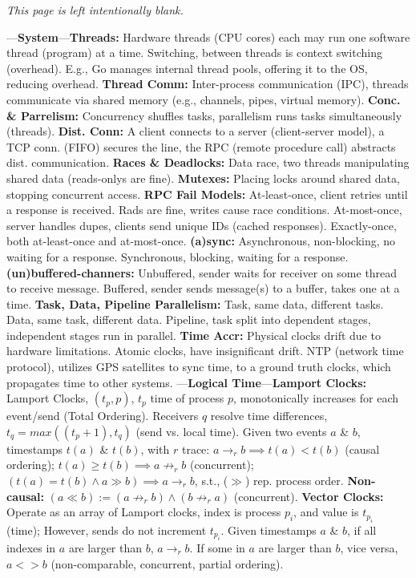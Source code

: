 


\thispagestyle{empty}
\mbox{}
\vfill
\begin{center}
    \textit{This page is left intentionally blank.}
\end{center}
\vfill
\newpage
\noindent


\begin{multicols}{2}

\noindent
---\textbf{System}---\textbf{Threads:} Hardware threads (CPU cores) each
may run one software thread (program) at a time. Switching,
between threads is context switching (overhead). E.g.,
Go manages internal thread pools, offering it to the OS,
reducing overhead.
\textbf{Thread Comm:} Inter-process communication (IPC), 
threads communicate via shared memory (e.g., channels, pipes, virtual memory).
\textbf{Conc. \& Parrelism:} Concurrency shuffles tasks,
parallelism runs tasks simultaneously (threads).
\textbf{Dist. Conn:} A client connects to a server (client-server model), a TCP conn. (FIFO)
secures the line, the RPC (remote procedure call) abstracts
dist. communication.
\textbf{Races \& Deadlocks:} Data race, two threads manipulating shared data (reads-onlys are fine).
\textbf{Mutexes:} Placing locks around shared data, stopping concurrent access.
\textbf{RPC Fail Models:} At-least-once, client retries until a response is received.
Rads are fine, writes cause race conditions. At-most-once, server handles dupes, clients
send unique IDs (cached responses). Exactly-once, both at-least-once and at-most-once.
\textbf{(a)sync:} Asynchronous, non-blocking, no waiting for a response. Synchronous, blocking, waiting for a response.
\textbf{(un)buffered-channers:} Unbuffered, sender waits for receiver on some thread to receive message. Buffered, sender sends message(s) to a buffer, takes one at a time.
\textbf{Task, Data, Pipeline Parallelism:} Task, same data, different tasks. Data, same task, different data. Pipeline, task split into dependent stages, independent stages run in parallel.
\textbf{Time Accr:} Physical clocks drift due to hardware limitations. Atomic clocks, have insignificant drift. NTP (network time protocol), 
utilizes GPS satellites to sync time, to a ground truth clocks, which propagates time to other systems.
---\textbf{Logical Time}---\textbf{Lamport Clocks:} 
Lamport Clocks, $(t_p, p)$, $t_p$ time of process $p$, monotonically increases for each event/send (Total Ordering). 
Receivers $q$ resolve time differences, $t_q = max((t_p+1), t_q)$ (send vs. local time). Given 
two events $a$ \& $b$, timestamps $t(a)$ \& $t(b)$, with $r$ trace: $a\to_r b \implies t(a) < t(b)$ (causal ordering);
$t(a) \geq t(b) \implies a \not\to_r b$ (concurrent); $(t(a) = t(b) \land a\gg b) \implies a \to_r b$, s.t., ($\gg$) rep. process order.
\textbf{Non-causal:} $(a\ll b):= (a \not\to_r b) \land (b\not\to_r a)$ (concurrent).
\textbf{Vector Clocks:} Operate as an array of Lamport clocks, index is process $p_i$, and value is $t_{p_i}$ (time); However, sends do not increment $t_{p_i}$.
Given timestamps $a$ \& $b$, if all indexes in $a$ are larger than $b$, $a\to_r b$. If some in $a$ are larger than $b$, vice versa, $a<>b$ (non-comparable, concurrent, partial ordering).


\end{multicols}
